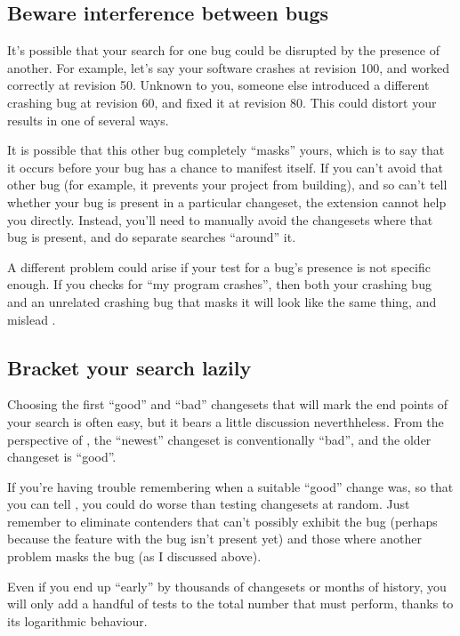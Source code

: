 \subsection{Beware interference between bugs}

It's possible that your search for one bug could be disrupted by the
presence of another.  For example, let's say your software crashes at
revision 100, and worked correctly at revision 50.  Unknown to you,
someone else introduced a different crashing bug at revision 60, and
fixed it at revision 80.  This could distort your results in one of
several ways.

It is possible that this other bug completely ``masks'' yours, which
is to say that it occurs before your bug has a chance to manifest
itself.  If you can't avoid that other bug (for example, it prevents
your project from building), and so can't tell whether your bug is
present in a particular changeset, the  extension cannot
help you directly.  Instead, you'll need to manually avoid the
changesets where that bug is present, and do separate searches
``around'' it.

A different problem could arise if your test for a bug's presence is
not specific enough.  If you checks for ``my program crashes'', then
both your crashing bug and an unrelated crashing bug that masks it
will look like the same thing, and mislead .

\subsection{Bracket your search lazily}

Choosing the first ``good'' and ``bad'' changesets that will mark the
end points of your search is often easy, but it bears a little
discussion neverthheless.  From the perspective of , the
``newest'' changeset is conventionally ``bad'', and the older
changeset is ``good''.

If you're having trouble remembering when a suitable ``good'' change
was, so that you can tell , you could do worse than
testing changesets at random.  Just remember to eliminate contenders
that can't possibly exhibit the bug (perhaps because the feature with
the bug isn't present yet) and those where another problem masks the
bug (as I discussed above).

Even if you end up ``early'' by thousands of changesets or months of
history, you will only add a handful of tests to the total number that
 must perform, thanks to its logarithmic behaviour.

